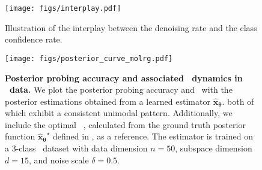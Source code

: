     

    


\begin{figure}[t] %
    \centering
    \texttt{[image: figs/interplay.pdf]}
    \caption{Illustration of the interplay between the denoising rate and the class confidence rate.}
    \label{fig:trade_off}
\end{figure}
\vspace{-0.1in}


\begin{figure}[t]
    \centering
    \texttt{[image: figs/posterior\_curve\_molrg.pdf]}
\caption{\textbf{Posterior probing accuracy and associated \CSNR~dynamics in \MoLRG~data.} We plot the posterior probing accuracy and \CSNR~with the posterior estimations obtained from a learned estimator $\bm{\hat x_\theta}$. both of which exhibit a consistent unimodal pattern. Additionally, we include the optimal \CSNR~, calculated from the ground truth posterior function $\bm{\hat x_\theta}^\star$ defined in , as a reference. The estimator is trained on a 3-class \MoLRG~dataset with data dimension $n=50$, subspace dimension $d=15$, and noise scale $\delta=0.5$.}
\label{fig:csnr_molrg_match}
\end{figure}


